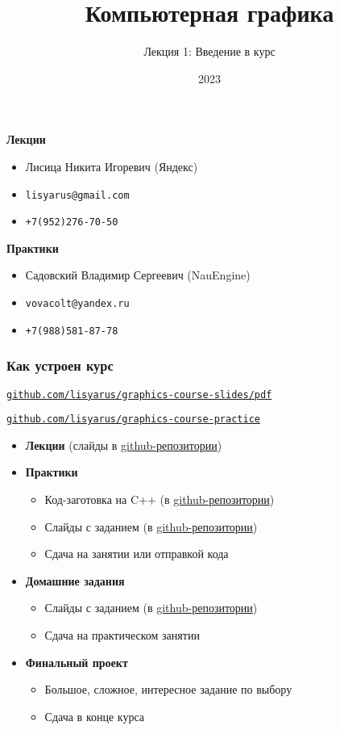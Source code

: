 \documentclass[10pt]{beamer}
\title{Компьютерная графика}
\subtitle{Лекция 1: Введение в курс}
\date{2023}
\begin{document}
\frame{\titlepage}

\begin{frame}
\frametitle{}
\textbf{Лекции}
\begin{itemize}
\item Лисица Никита Игоревич (Яндекс)
\item \nolinkurl{lisyarus@gmail.com}
\item \nolinkurl{+7(952)276-70-50}
\end{itemize}
\textbf{Практики}
\begin{itemize}
\item Садовский Владимир Сергеевич (NauEngine)
\item \nolinkurl{vovacolt@yandex.ru}
\item \nolinkurl{+7(988)581-87-78}
\end{itemize}
\end{frame}

\begin{frame}
\frametitle{Как устроен курс}
\href{https://github.com/lisyarus/graphics-course-slides/tree/master/pdf}{\nolinkurl{github.com/lisyarus/graphics-course-slides/pdf}}

\href{https://github.com/lisyarus/graphics-course-practice/tree/master/pdf}{\nolinkurl{github.com/lisyarus/graphics-course-practice}}
\pause
\begin{itemize}
\item \textbf{Лекции} (слайды в \href{https://github.com/lisyarus/graphics-course-slides/tree/master/2022/pdf}{github-репозитории})
\pause
\item \textbf{Практики}
\pause
\begin{itemize}
\item Код-заготовка на C++ (в \href{https://github.com/lisyarus/graphics-course-practice/tree/master/2022}{github-репозитории})
\pause
\item Слайды с заданием (в \href{https://github.com/lisyarus/graphics-course-slides/tree/master/2022/pdf}{github-репозитории})
\pause
\item Сдача на занятии или отправкой кода
\end{itemize}
\pause
\item \textbf{Домашние задания}
\pause
\begin{itemize}
\item Слайды с заданием (в \href{https://github.com/lisyarus/graphics-course-slides/tree/master/2022/pdf}{github-репозитории})
\pause
\item Сдача на практическом занятии 
\end{itemize}
\pause
\item \textbf{Финальный проект}
\begin{itemize}
\item Большое, сложное, интересное задание по выбору
\pause
\item Сдача в конце курса
\end{itemize}
\end{itemize}
\end{frame}
\end{document}
